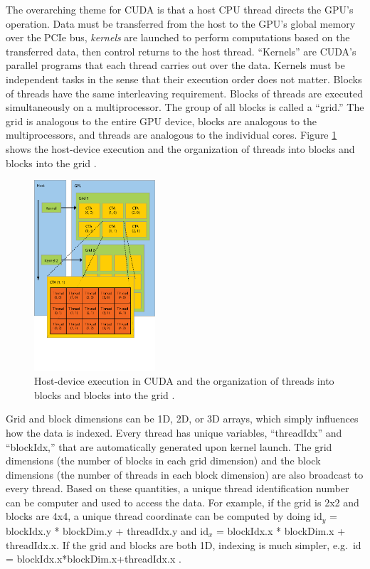 The overarching theme for CUDA is that a host CPU thread directs the GPU's operation.  Data must be transferred from the host to the GPU's global memory over the PCIe bus, \emph{kernels} are launched to perform computations based on the transferred data, then control returns to the host thread.  ``Kernels'' are CUDA's parallel programs that each thread carries out over the data.  Kernels must be independent tasks in the sense that their execution order does not matter.  Blocks of threads have the same interleaving requirement.%
  Blocks of threads are executed simultaneously on a multiprocessor.  The group of all blocks is called a ``grid.''  The grid is analogous to the entire GPU device, blocks are analogous to the multiprocessors, and threads are analogous to the individual cores. Figure \ref{cuda_grid_launch} shows the host-device execution and the organization of threads into blocks and blocks into the grid \cite{cuda}.

\begin{figure}[h!] 
  \centering
    \includegraphics[width=0.4\textwidth,trim= 0cm 2.5cm 0cm 0cm]{graphics/CUDA_grid_launch.eps}
     \caption[Host-device execution in CUDA and the organization of threads into blocks and blocks into the grid.]{ Host-device execution in CUDA and the organization of threads into blocks and blocks into the grid \cite{cuda_ptx_isa}. \label{cuda_grid_launch}}
\end{figure}

Grid and block dimensions can be 1D, 2D, or 3D arrays, which simply influences how the data is indexed.  Every thread has unique variables, ``threadIdx'' and ``blockIdx,'' that are automatically generated upon kernel launch.  The grid dimensions (the number of blocks in each grid dimension) and the block dimensions (the number of threads in each block dimension) are also broadcast to every thread.  Based on these quantities, a unique thread identification number can be computer and used to access the data.   For example, if the grid is 2x2 and blocks are 4x4, a unique thread coordinate can be computed by doing id$_y$ = blockIdx.y * blockDim.y + threadIdx.y and id$_x$ = blockIdx.x * blockDim.x + threadIdx.x.  If the grid and blocks are both 1D, indexing is much simpler, e.g.\ id = blockIdx.x*blockDim.x+threadIdx.x \cite{cuda}.

